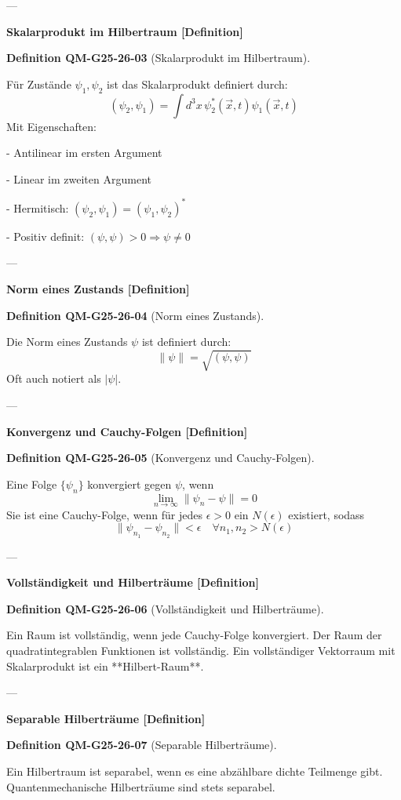 \documentclass[10pt, letterpaper]{article}
\newcommand{\CustomHeading}[3]{%
  \par\medskip\noindent%
  \textbf{#1 #2} \textnormal{(#3)}.\enskip%
}
\newenvironment{DEF}[2]{\begin{unitbox}\CustomHeading{Definition}{#1}{#2}}{\end{unitbox}}
\begin{document}
---

\textbf{Skalarprodukt im Hilbertraum [Definition]}

\begin{DEF}{QM-G25-26-03}{Skalarprodukt im Hilbertraum}
Für Zustände $\psi_1, \psi_2$ ist das Skalarprodukt definiert durch:
\[
\left(\psi_2, \psi_1\right) = \int d^3x \, \psi_2^*(\vec{x}, t) \psi_1(\vec{x}, t)
\]
Mit Eigenschaften:

- Antilinear im ersten Argument

- Linear im zweiten Argument

- Hermitisch: $(\psi_2, \psi_1) = (\psi_1, \psi_2)^*$

- Positiv definit: $(\psi, \psi) > 0 \Rightarrow \psi \ne 0$
\end{DEF}

---

\textbf{Norm eines Zustands [Definition]}

\begin{DEF}{QM-G25-26-04}{Norm eines Zustands}
Die Norm eines Zustands $\psi$ ist definiert durch:
\[
\|\psi\| = \sqrt{(\psi, \psi)}
\]
Oft auch notiert als $|\psi|$.
\end{DEF}

---

\textbf{Konvergenz und Cauchy-Folgen [Definition]}

\begin{DEF}{QM-G25-26-05}{Konvergenz und Cauchy-Folgen}
Eine Folge $\{\psi_n\}$ konvergiert gegen $\psi$, wenn
\[
\lim_{n \to \infty} \|\psi_n - \psi\| = 0
\]
Sie ist eine Cauchy-Folge, wenn für jedes $\epsilon > 0$ ein $N(\epsilon)$ existiert, sodass
\[
\|\psi_{n_1} - \psi_{n_2}\| < \epsilon \quad \forall n_1, n_2 > N(\epsilon)
\]
\end{DEF}

---

\textbf{Vollständigkeit und Hilberträume [Definition]}

\begin{DEF}{QM-G25-26-06}{Vollständigkeit und Hilberträume}
Ein Raum ist vollständig, wenn jede Cauchy-Folge konvergiert. Der Raum der quadratintegrablen Funktionen ist vollständig. Ein vollständiger Vektorraum mit Skalarprodukt ist ein **Hilbert-Raum**.
\end{DEF}

---

\textbf{Separable Hilberträume [Definition]}

\begin{DEF}{QM-G25-26-07}{Separable Hilberträume}
Ein Hilbertraum ist separabel, wenn es eine abzählbare dichte Teilmenge gibt. Quantenmechanische Hilberträume sind stets separabel.
\end{DEF}
\end{document}
